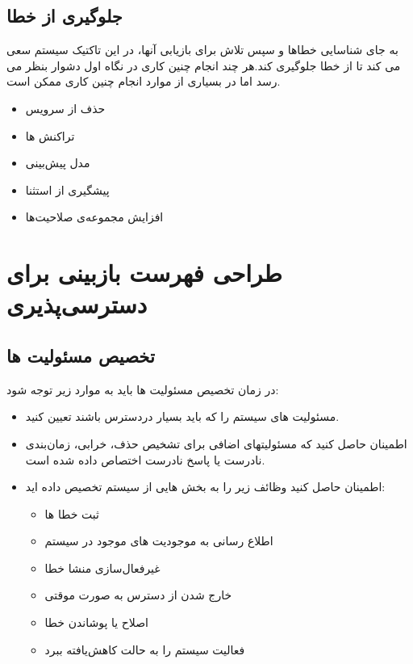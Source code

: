 \subsection{جلوگیری از خطا}
به جای شناسایی خطاها و سپس تلاش برای بازیابی آنها، در این تاکتیک سیستم سعی می کند تا از خطا جلوگیری کند.هر چند انجام چنین کاری در نگاه اول دشوار بنظر می رسد اما در بسیاری از موارد انجام چنین کاری ممکن است.
\begin{itemize}
\item 
حذف از سرویس 
\item
تراکنش ها 
\item
مدل پیش‌بینی 
\item
پیشگیری از استثنا 
\item
افزایش مجموعه‌ی صلاحیت‌ها 
\end{itemize}

\section{طراحی فهرست بازبینی برای دسترسی‌پذیری}
\subsection{تخصیص مسئولیت ها} 
در زمان تخصیص مسئولیت ها باید  به موارد زیر توجه شود:
\begin{itemize}
\item
مسئولیت های سیستم را که باید بسیار در‌دسترس باشند تعیین کنید.
\item
اطمینان حاصل کنید که مسئولیتهای اضافی برای تشخیص حذف، خرابی، زمان‌بندی نادرست یا پاسخ نادرست اختصاص داده شده است.
\item
اطمینان حاصل کنید وظائف زیر را به بخش هایی از سیستم تخصیص داده اید:
\begin{itemize}
\item
ثبت خطا ها
\item
اطلاع رسانی به موجودیت های موجود در سیستم
\item
غیر‌فعال‌سازی منشا خطا
\item
خارج شدن از دسترس به صورت موقتی
\item
اصلاح یا پوشاندن خطا
\item
فعالیت سیستم را به حالت کاهش‌یافته  ببرد
\end{itemize}
\end{itemize}
